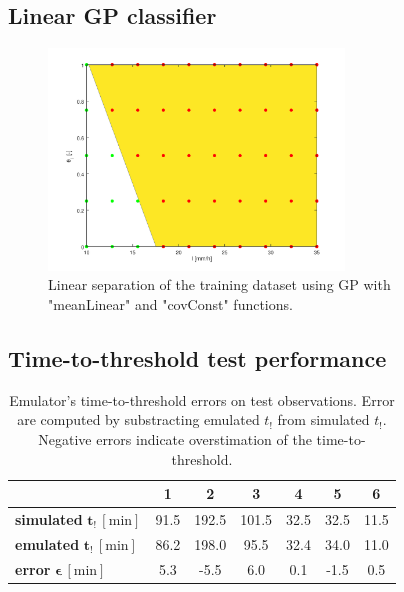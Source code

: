 \subsection{Linear GP classifier}
\begin{figure}[H]
  \centering
  \includegraphics[width=0.7\textwidth]{Figures/classifier_trn.png}
  \caption{Linear separation of the training dataset using GP with "meanLinear" and "covConst" functions.}
  \label{fig:classifier_rough}
\end{figure}


\subsection{Time-to-threshold test performance}
\begin{table}[H]
  \centering
  \caption{Emulator's time-to-threshold errors on test observations. Error are computed by substracting emulated $t_!$ from simulated $t_!$. Negative errors indicate overstimation of the time-to-threshold.}
  \label{tab:validation_performance}
  \begin{tabular}{lcccccc}
    \toprule
     & \textbf{1} & \textbf{2} & \textbf{3} & \textbf{4} & \textbf{5} & \textbf{6}\\
    \midrule
    \textbf{simulated} $\bm{t_!}\,[\si{\minute}]$     & 91.5 & 192.5 & 101.5 & 32.5 & 32.5 & 11.5\\
    \textbf{emulated}  $\bm{t_!}\,[\si{\minute}]$     & 86.2 & 198.0 & 95.5  & 32.4 & 34.0 & 11.0\\
    \textbf{error}     $\bm{\epsilon}\,[\si{\minute}]$ & 5.3  & -5.5  & 6.0   & 0.1  & -1.5 & 0.5\\
    \bottomrule
  \end{tabular}
\end{table}

